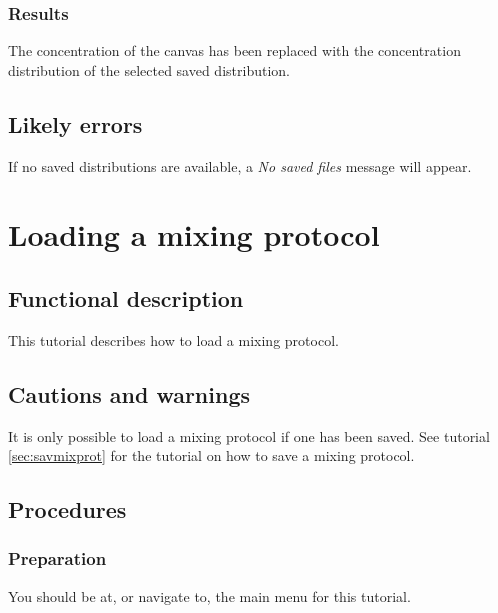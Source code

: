 \subsubsection{Results}
The concentration of the canvas has been replaced with the concentration distribution of the selected saved distribution.

\subsection{Likely errors}
If no saved distributions are available, a \emph{No saved files} message will appear.


\section{Loading a mixing protocol}
\label{sec:loadMixProt}

\subsection{Functional description}
This tutorial describes how to load a mixing protocol.

\subsection{Cautions and warnings}
It is only possible to load a mixing protocol if one has been saved. See tutorial \ref{sec:savmixprot} for the tutorial on how to save a mixing protocol.

\subsection{Procedures}
\subsubsection{Preparation}
You should be at, or navigate to, the main menu for this tutorial.

